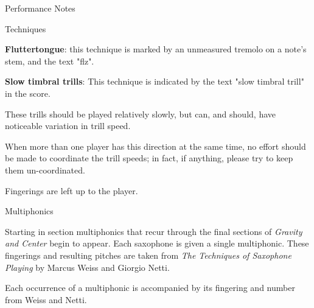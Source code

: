 \documentclass{article}
\begin{document}
\begin{center}
  {\Huge Performance Notes}
\end{center}

{\Large Techniques}

\textbf{Fluttertongue}: this technique is marked by an unmeasured tremolo on a note's stem, and the text "flz".
{%
\parindent 0pt
\noindent
\ifx\preLilyPondExample \undefined
\else
  \expandafter\preLilyPondExample
\fi
\def\lilypondbook{}%
%
\ifx\postLilyPondExample \undefined
\else
  \expandafter\postLilyPondExample
\fi
}

\textbf{Slow timbral trills}:
This technique is indicated by the text "slow timbral trill" in the score.
{%
\parindent 0pt
\noindent
\ifx\preLilyPondExample \undefined
\else
  \expandafter\preLilyPondExample
\fi
\def\lilypondbook{}%
%
\ifx\postLilyPondExample \undefined
\else
  \expandafter\postLilyPondExample
\fi
}

These trills should be played relatively slowly, but can, and should, have noticeable
variation in trill speed.

When more than one player has this direction at the same time, no effort should
be made to coordinate the trill speeds; in fact, if anything, please try to keep them un-coordinated.

Fingerings are left up to the player.

\pagebreak

{\Large Multiphonics}

Starting in section\hspace{-.5em}{%
\parindent 0pt
\noindent
\ifx\preLilyPondExample \undefined
\else
  \expandafter\preLilyPondExample
\fi
\def\lilypondbook{}%
%
\ifx\postLilyPondExample \undefined
\else
  \expandafter\postLilyPondExample
\fi
} multiphonics that recur
through the final sections of \textit{Gravity and Center} begin to appear. Each saxophone is given
a single multiphonic. These fingerings and resulting pitches are taken from \textit{The Techniques of
Saxophone Playing} by Marcus Weiss and Giorgio Netti.

Each occurrence of a multiphonic is accompanied by its fingering and number from Weiss and Netti.

\begin{quote}
{%
\parindent 0pt
\noindent
\ifx\preLilyPondExample \undefined
\else
  \expandafter\preLilyPondExample
\fi
\def\lilypondbook{}%
%
\ifx\postLilyPondExample \undefined
\else
  \expandafter\postLilyPondExample
\fi
}
\end{quote}
\end{document}
